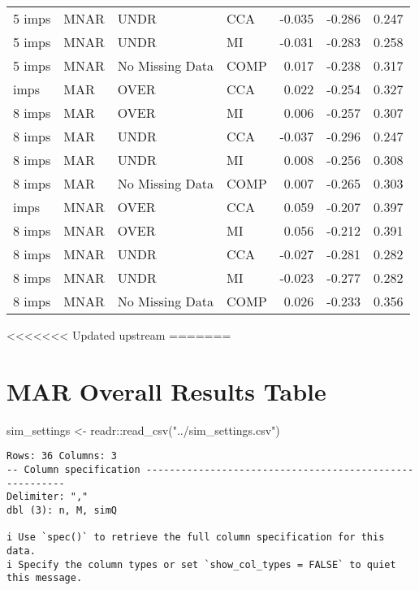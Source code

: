 \documentclass[
  letterpaper,
  DIV=11,
  numbers=noendperiod]{scrartcl}
\newenvironment{Shaded}{\begin{snugshade}}{\end{snugshade}}
\newcommand{\FunctionTok}[1]{\textcolor[rgb]{0.28,0.35,0.67}{#1}}
\newcommand{\NormalTok}[1]{\textcolor[rgb]{0.00,0.23,0.31}{#1}}
\newcommand{\OtherTok}[1]{\textcolor[rgb]{0.00,0.23,0.31}{#1}}
\newcommand{\SpecialCharTok}[1]{\textcolor[rgb]{0.37,0.37,0.37}{#1}}
\newcommand{\StringTok}[1]{\textcolor[rgb]{0.13,0.47,0.30}{#1}}
\begin{document}
\begin{tabular}[t]{llllrrr}
5 imps & MNAR & UNDR & CCA & -0.035 & -0.286 & 0.247\\
5 imps & MNAR & UNDR & MI & -0.031 & -0.283 & 0.258\\
5 imps & MNAR & No Missing Data & COMP & 0.017 & -0.238 & 0.317\\
\addlinespace
8 imps & MAR & OVER & CCA & 0.022 & -0.254 & 0.327\\
8 imps & MAR & OVER & MI & 0.006 & -0.257 & 0.307\\
8 imps & MAR & UNDR & CCA & -0.037 & -0.296 & 0.247\\
8 imps & MAR & UNDR & MI & 0.008 & -0.256 & 0.308\\
8 imps & MAR & No Missing Data & COMP & 0.007 & -0.265 & 0.303\\
\addlinespace
8 imps & MNAR & OVER & CCA & 0.059 & -0.207 & 0.397\\
8 imps & MNAR & OVER & MI & 0.056 & -0.212 & 0.391\\
8 imps & MNAR & UNDR & CCA & -0.027 & -0.281 & 0.282\\
8 imps & MNAR & UNDR & MI & -0.023 & -0.277 & 0.282\\
8 imps & MNAR & No Missing Data & COMP & 0.026 & -0.233 & 0.356\\
\bottomrule
\end{tabular}

<<<<<<< Updated upstream
=======
\hypertarget{mar-overall-results-table}{%
\section{MAR Overall Results Table}\label{mar-overall-results-table}}

\begin{Shaded}
\begin{Highlighting}[]
\NormalTok{sim\_settings }\OtherTok{\textless{}{-}}\NormalTok{ readr}\SpecialCharTok{::}\FunctionTok{read\_csv}\NormalTok{(}\StringTok{"../sim\_settings.csv"}\NormalTok{)}
\end{Highlighting}
\end{Shaded}

\begin{verbatim}
Rows: 36 Columns: 3
-- Column specification --------------------------------------------------------
Delimiter: ","
dbl (3): n, M, simQ

i Use `spec()` to retrieve the full column specification for this data.
i Specify the column types or set `show_col_types = FALSE` to quiet this message.
\end{verbatim}
\end{document}
